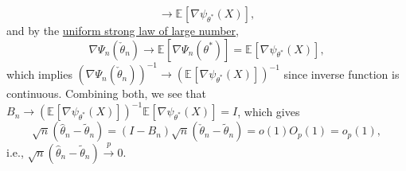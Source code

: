\begin{explanation}
\[		\to \mathbb{E}_{}[\nabla \psi _{\theta ^{\ast} }(X)] ,
	\]
	and by the \hyperref[thm:uniform-SLLN]{uniform strong law of large number},
	\[
		\nabla \Psi _n(\check{\theta }_n)
		\to \mathbb{E}_{}[\nabla \Psi _n(\theta ^{\ast} )]
		= \mathbb{E}_{}[\nabla \psi _{\theta ^{\ast} }(X)],
	\]
	which implies \((\nabla \Psi _n(\check{\theta }_n))^{-1} \to (\mathbb{E}_{}[\nabla \psi _{\theta ^{\ast} }(X)] )^{-1} \) since inverse function is continuous. Combining both, we see that \(B_n \to (\mathbb{E}_{}[\nabla \psi _{\theta ^{\ast} }(X)])^{-1} \mathbb{E}_{}[\nabla \psi _{\theta ^{\ast} }(X)] = I\), which gives
	\[
		\sqrt{n} (\hat{\theta} _n - \widetilde{\theta} _n)
		= (I - B_n) \sqrt{n} (\check{\theta }_n - \widetilde{\theta} _n)
		= o(1) O_p(1)
		= o_p(1),
	\]
	i.e., \(\sqrt{n} (\hat{\theta} _n - \widetilde{\theta} _n) \overset{p}{\to} 0\).
\end{explanation}